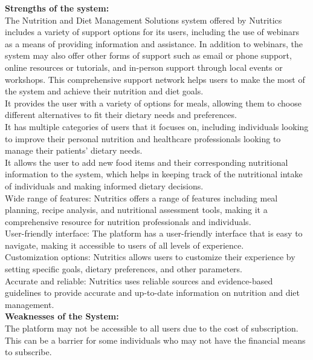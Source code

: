 \documentclass {article}
\begin{document}
\noindent \textbf{Strengths of the system: }\\
\noindent The Nutrition and Diet Management Solutions system offered by Nutritics includes a variety of support options for its users, including the use of webinars as a means of providing information and assistance. In addition to webinars, the system may also offer other forms of support such as email or phone support, online resources or tutorials, and in-person support through local events or workshops. This comprehensive support network helps users to make the most of the system and achieve their nutrition and diet goals.\\

\noindent It provides the user with a variety of options for meals, allowing them to choose different alternatives to fit their dietary needs and preferences.\\

\noindent It has multiple categories of users that it focuses on, including individuals looking to improve their personal nutrition and healthcare professionals looking to manage their patients’ dietary needs.\\

\noindent It allows the user to add new food items and their corresponding nutritional information to the system, which helps in keeping track of the nutritional intake of individuals and making informed dietary decisions.\\

\noindent Wide range of features: Nutritics offers a range of features including meal planning, recipe analysis, and nutritional assessment tools, making it a comprehensive resource for nutrition professionals and individuals.\\

\noindent User-friendly interface: The platform has a user-friendly interface that is easy to navigate, making it accessible to users of all levels of experience.\\

\noindent Customization options: Nutritics allows users to customize their experience by setting specific goals, dietary preferences, and other parameters.\\

\noindent Accurate and reliable: Nutritics uses reliable sources and evidence-based guidelines to provide accurate and up-to-date information on nutrition and diet management.\\

\noindent \textbf{Weaknesses of the System: \\}
\noindent The platform may not be accessible to all users due to the cost of subscription. This can be a barrier for some individuals who may not have the financial means to subscribe.\\
\end{document}
